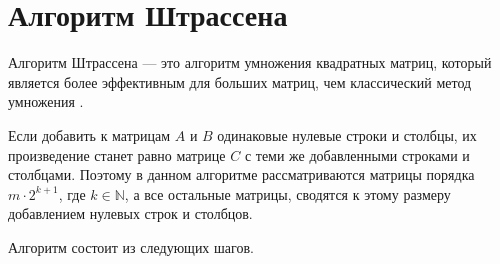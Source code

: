 \section{Алгоритм Штрассена}

Алгоритм Штрассена --- это алгоритм умножения квадратных матриц, который является более эффективным для больших матриц, чем классический метод умножения \cite{strassen}.

Если добавить к матрицам $A$ и $B$ одинаковые нулевые строки и столбцы, их произведение станет равно матрице $C$ с теми же добавленными строками и столбцами. Поэтому в данном алгоритме рассматриваются матрицы порядка $m \cdot 2^{k + 1}$, где $ k \in \mathbb{N} $, а все остальные матрицы, сводятся к этому размеру добавлением нулевых строк и столбцов. 

Алгоритм состоит из следующих шагов.

